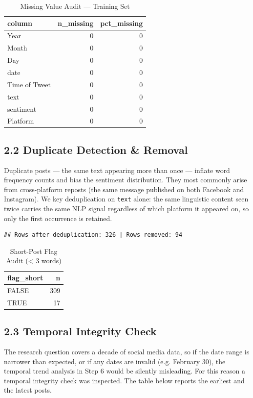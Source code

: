\documentclass[
]{article}
\begin{document}
\begin{longtable}[t]{lrr}
\caption{\label{tab:data-quality}Missing Value Audit — Training Set}\\
\toprule
column & n\_missing & pct\_missing\\
\midrule
Year & 0 & 0\\
Month & 0 & 0\\
Day & 0 & 0\\
date & 0 & 0\\
Time of Tweet & 0 & 0\\
\addlinespace
text & 0 & 0\\
sentiment & 0 & 0\\
Platform & 0 & 0\\
\bottomrule
\end{longtable}

\subsection{2.2 Duplicate Detection \&
Removal}\label{duplicate-detection-removal}

Duplicate posts --- the same text appearing more than once --- inflate
word frequency counts and bias the sentiment distribution. They most
commonly arise from cross-platform reposts (the same message published
on both Facebook and Instagram). We key deduplication on \texttt{text}
alone: the same linguistic content seen twice carries the same NLP
signal regardless of which platform it appeared on, so only the first
occurrence is retained.

\begin{verbatim}
## Rows after deduplication: 326 | Rows removed: 94
\end{verbatim}

\begin{longtable}[t]{lr}
\caption{\label{tab:duplicates}Short-Post Flag Audit (< 3 words)}\\
\toprule
flag\_short & n\\
\midrule
FALSE & 309\\
TRUE & 17\\
\bottomrule
\end{longtable}

\subsection{2.3 Temporal Integrity
Check}\label{temporal-integrity-check}

The research question covers a decade of social media data, so if the
date range is narrower than expected, or if any dates are invalid (e.g.
February 30), the temporal trend analysis in Step 6 would be silently
misleading. For this reason a temporal integrity check was inspected.
The table below reports the earliest and the latest posts.
\end{document}

